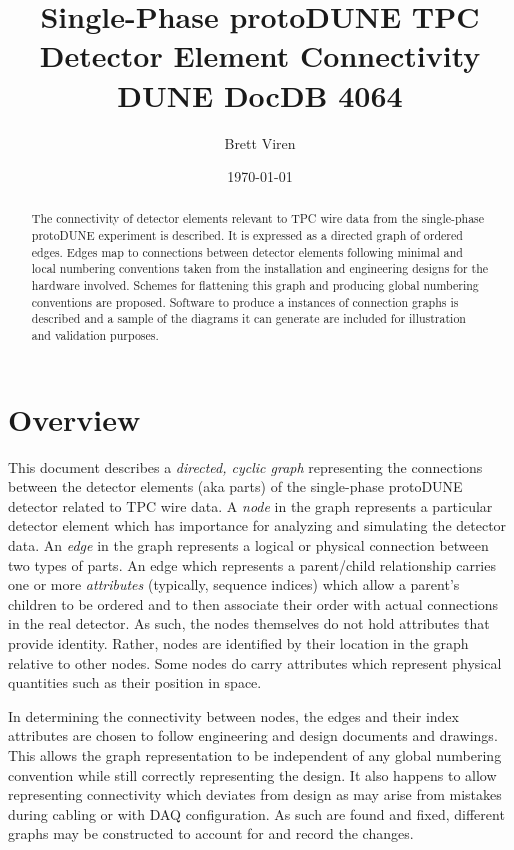 \documentclass[pdftex,12pt,letter]{article}
\author{Brett Viren}
\date{\today}
\title{Single-Phase protoDUNE TPC \\ Detector Element Connectivity\\{\small DUNE DocDB 4064}}
\begin{document}
\maketitle

\begin{abstract}
  \noindent The connectivity of detector elements relevant to TPC wire
  data from the single-phase protoDUNE experiment is described.  It is
  expressed as a directed graph of ordered edges.  Edges map to
  connections between detector elements following minimal and local
  numbering conventions taken from the installation and engineering
  designs for the hardware involved.  Schemes for flattening this
  graph and producing global numbering conventions are proposed.
  Software to produce a instances of connection graphs is described
  and a sample of the diagrams it can generate are included for
  illustration and validation purposes.
\end{abstract}

\tableofcontents
\newpage
\section{Overview}

This document describes a \textit{directed, cyclic graph} representing
the connections between the detector elements (aka parts) of the
single-phase protoDUNE detector related to TPC wire data.  A
\textit{node} in the graph represents a particular detector element
which has importance for analyzing and simulating the detector data.
An \textit{edge} in the graph represents a logical or physical
connection between two types of parts.  An edge which represents a
parent/child relationship carries one or more \textit{attributes}
(typically, sequence indices) which allow a parent's children to be ordered and
to then associate their order with actual connections in the real
detector.  As such, the nodes themselves do not hold attributes that
provide identity.  Rather, nodes are identified by their location in
the graph relative to other nodes.  Some nodes do carry attributes
which represent physical quantities such as their position in space.

In determining the connectivity between nodes, the edges and their
index attributes are chosen to follow engineering and design documents and
drawings.  This allows the graph representation to be independent of
any global numbering convention while still correctly representing the
design.  It also happens to allow representing connectivity which
deviates from design as may arise from mistakes during cabling or with
DAQ configuration.  As such are found and fixed, different graphs may
be constructed to account for and record the changes.
\end{document}
